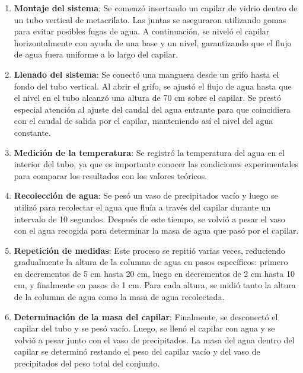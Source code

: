 	
	\begin{enumerate}
		\item \textbf{Montaje del sistema}: Se comenzó insertando un capilar de vidrio dentro de un tubo vertical de metacrilato. Las juntas se aseguraron utilizando gomas para evitar posibles fugas de agua. A continuación, se niveló el capilar horizontalmente con ayuda de una base y un nivel, garantizando que el flujo de agua fuera uniforme a lo largo del capilar.
		
		\item \textbf{Llenado del sistema}: Se conectó una manguera desde un grifo hasta el fondo del tubo vertical. Al abrir el grifo, se ajustó el flujo de agua hasta que el nivel en el tubo alcanzó una altura de 70 cm sobre el capilar. Se prestó especial atención al ajuste del caudal del agua entrante para que coincidiera con el caudal de salida por el capilar, manteniendo así el nivel del agua constante.
		
		\item \textbf{Medición de la temperatura}: Se registró la temperatura del agua en el interior del tubo, ya que es importante conocer las condiciones experimentales para comparar los resultados con los valores teóricos.
		
		\item \textbf{Recolección de agua}: Se pesó un vaso de precipitados vacío y luego se utilizó para recolectar el agua que fluía a través del capilar durante un intervalo de 10 segundos. Después de este tiempo, se volvió a pesar el vaso con el agua recogida para determinar la masa de agua que pasó por el capilar.
		
		\item \textbf{Repetición de medidas}: Este proceso se repitió varias veces, reduciendo gradualmente la altura de la columna de agua en pasos específicos: primero en decrementos de 5 cm hasta 20 cm, luego en decrementos de 2 cm hasta 10 cm, y finalmente en pasos de 1 cm. Para cada altura, se midió tanto la altura de la columna de agua como la masa de agua recolectada.
		
		\item \textbf{Determinación de la masa del capilar}: Finalmente, se desconectó el capilar del tubo y se pesó vacío. Luego, se llenó el capilar con agua y se volvió a pesar junto con el vaso de precipitados. La masa del agua dentro del capilar se determinó restando el peso del capilar vacío y del vaso de precipitados del peso total del conjunto.
		
	\end{enumerate}

